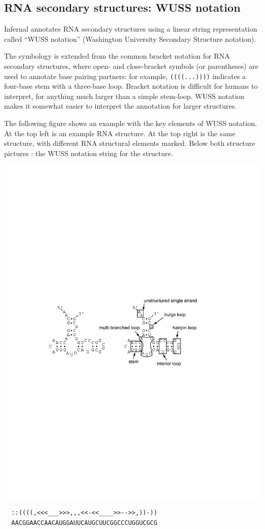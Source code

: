 \subsection{RNA secondary structures: WUSS notation}
\label{section:wuss}

Infernal annotates RNA secondary structures using a linear
string representation called ``WUSS notation'' (Washington University
Secondary Structure notation).

The symbology is extended from the common bracket notation for RNA
secondary structures, where open- and close-bracket symbols (or
parentheses) are used to annotate base pairing partners: for example,
\verb+((((...))))+ indicates a four-base stem with a three-base loop.
Bracket notation is difficult for humans to interpret, for anything
much larger than a simple stem-loop. WUSS notation makes it somewhat
easier to interpret the annotation for larger structures.

The following figure shows an example with the key elements of WUSS
notation.  At the top left is an example RNA structure. At the top
right is the same structure, with different RNA structural elements
marked. Below both structure pictures : the WUSS notation string for
the structure.

\begin{center}
\includegraphics[scale=0.8]{Figures/rna_elements}
\end{center}
\begin{center}
\begin{BVerbatim}
  ::((((,<<<___>>>,,,<<-<<____>>-->>,))-))
  AACGGAACCAACAUGGAUUCAUGCUUCGGCCCUGGUCGCG
\end{BVerbatim}
\end{center}

